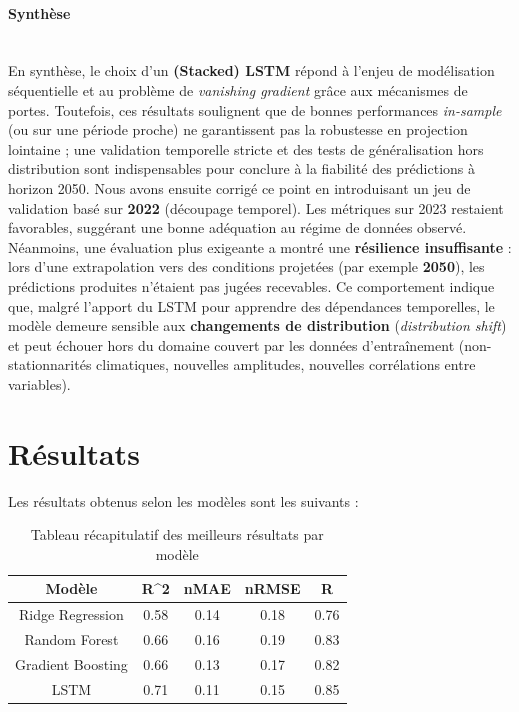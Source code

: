 \documentclass{article}
\theoremstyle{nopointbreak}
\theoremstyle{nobrkbold}
\begin{document}
\paragraph{Synthèse} \\
En synthèse, le choix d'un \textbf{(Stacked) LSTM} répond à l'enjeu de modélisation séquentielle et au problème de \emph{vanishing gradient} grâce aux mécanismes de portes. Toutefois, ces résultats soulignent que de bonnes performances \emph{in-sample} (ou sur une période proche) ne garantissent pas la robustesse en projection lointaine ; une validation temporelle stricte et des tests de généralisation hors distribution sont indispensables pour conclure à la fiabilité des prédictions à horizon 2050.
Nous avons ensuite corrigé ce point en introduisant un jeu de validation basé sur \textbf{2022} (découpage temporel). Les métriques sur 2023 restaient favorables, suggérant une bonne adéquation au régime de données observé. Néanmoins, une évaluation plus exigeante a montré une \textbf{résilience insuffisante} : lors d'une extrapolation vers des conditions projetées (par exemple \textbf{2050}), les prédictions produites n'étaient pas jugées recevables. Ce comportement indique que, malgré l'apport du LSTM pour apprendre des dépendances temporelles, le modèle demeure sensible aux \textbf{changements de distribution} (\emph{distribution shift}) et peut échouer hors du domaine couvert par les données d'entraînement (non-stationnarités climatiques, nouvelles amplitudes, nouvelles corrélations entre variables).

\newpage

\section{Résultats}
Les résultats obtenus selon les modèles sont les suivants : \\

\begin{table}[H]
    \centering
    \begin{tabular}{|c|c|c|c|c|} %
    \hline %
    \textbf{Modèle} & \textbf{R}^2 & \textbf{nMAE} & \textbf{nRMSE} & \textbf{R} \\
    \hline %
    Ridge Regression & 0.58&0.14 & 0.18& 0.76\\
    \hline
    Random Forest & 0.66 & 0.16 & 0.19 & 0.83\\
    \hline
    Gradient Boosting & 0.66 &0.13 & 0.17 &0.82\\
    \hline
    LSTM & 0.71 &0.11 & 0.15& 0.85\\
    \hline %
    \end{tabular}
    \caption{Tableau récapitulatif des meilleurs résultats par modèle} %
    \label{tab:tableau_recapitulatif_resultats} %
\end{table}
\end{document}
